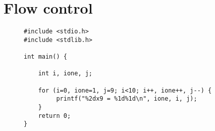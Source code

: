 \chapter{Flow control}
\label{cha:programmabesturing}
\thispagestyle{empty}


\begin{figure}[!ht]
\begin{lstlisting}[caption=Afdrukken van de tafel van 9 met behulp van de komma-operator.]
#include <stdio.h>
#include <stdlib.h>

int main() {

    int i, ione, j;

    for (i=0, ione=1, j=9; i<10; i++, ione++, j--) {
         printf("%2dx9 = %1d%1d\n", ione, i, j);
    }
    return 0;
}
\end{lstlisting}
\end{figure}
